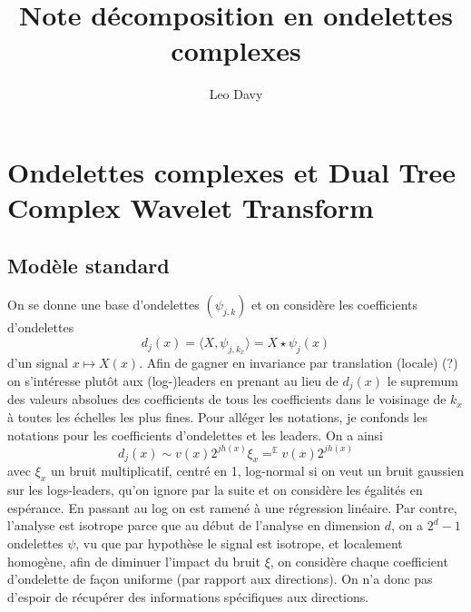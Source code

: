 \documentclass[11pt]{article} %
\title{Note décomposition en ondelettes complexes}
\author{Leo Davy}
\begin{document}
\maketitle
\section{Ondelettes complexes et Dual Tree Complex Wavelet Transform}
\subsection{Modèle standard}
On se donne une base d'ondelettes $(\psi_{j,k})$ et on considère les coefficients d'ondelettes
\begin{equation}
	d_j(x) = \langle X, \psi_{j,k_x} \rangle = X\star \psi_j (x)
\end{equation}
d'un signal $x\mapsto X(x)$. Afin de gagner en invariance par translation (locale) (?) on s'intéresse plutôt aux (log-)leaders en prenant au lieu de $d_j(x)$ le supremum des valeurs absolues des coefficients de tous les coefficients dans le voisinage de $k_x$ à toutes les échelles les plus fines. Pour alléger les notations, je confonds les notations pour les coefficients d'ondelettes et les leaders. On a ainsi
\begin{equation}
	d_j(x) \sim v(x)2^{jh(x)}\xi_x=^\mathbb{E} v(x)2^{jh(x)}
\end{equation}
avec $\xi_x$ un bruit multiplicatif, centré en 1, log-normal si on veut un bruit gaussien sur les logs-leaders, qu'on ignore par la suite et on considère les égalités en espérance. En passant au log on est ramené à une régression linéaire. Par contre, l'analyse est isotrope parce que au début de l'analyse en dimension $d$, on a $2^d - 1$ ondelettes $\psi$, vu que par hypothèse le signal est isotrope, et localement homogène, afin de diminuer l'impact du bruit $\xi$, on considère chaque coefficient d'ondelette de façon uniforme (par rapport aux directions). On n'a donc pas d'espoir de récupérer des informations spécifiques aux directions. 
\end{document}
